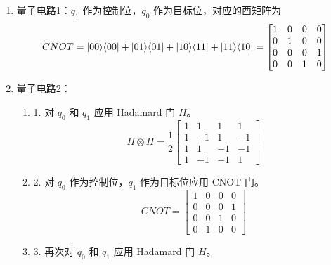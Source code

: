 \documentclass[11pt]{article}
\begin{document}
\begin{enumerate}
    \item 量子电路1：$q_1$ 作为控制位，$q_0$ 作为目标位，对应的酉矩阵为
    $$
    CNOT = |00\rangle \langle 00| + |01\rangle \langle 01| + |10\rangle \langle 11| + |11\rangle \langle 10|\\
        = \begin{bmatrix} 1 & 0 & 0 & 0 \\ 0 & 1 & 0 & 0 \\ 0 & 0 & 0 & 1 \\ 0 & 0 & 1 & 0 \end{bmatrix}
    $$
    \newpage
    \item 量子电路2：
    \begin{enumerate}
        \item 1. 对 $q_0$ 和 $q_1$ 应用 Hadamard 门 \(H\)。
        \[
        H \otimes H = \frac{1}{2} \begin{bmatrix} 
        1 & 1 & 1 & 1 \\ 
        1 & -1 & 1 & -1 \\ 
        1 & 1 & -1 & -1 \\ 
        1 & -1 & -1 & 1 
        \end{bmatrix}
        \]
        \item 2. 对 $q_0$ 作为控制位，$q_1$ 作为目标位应用 CNOT 门。
        \[
        CNOT = \begin{bmatrix} 
        1 & 0 & 0 & 0 \\ 
        0 & 0 & 0 & 1 \\ 
        0 & 0 & 1 & 0 \\ 
        0 & 1 & 0 & 0 
        \end{bmatrix}
        \]
        \item 3. 再次对 $q_0$ 和 $q_1$ 应用 Hadamard 门 \(H\)。


\end{enumerate}
\end{enumerate}
\end{document}
